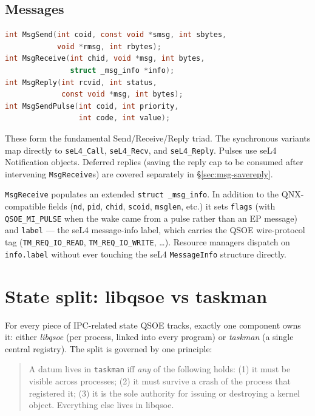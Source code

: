 \subsection{Messages}

\begin{lstlisting}[language=C]
int MsgSend(int coid, const void *smsg, int sbytes,
            void *rmsg, int rbytes);
int MsgReceive(int chid, void *msg, int bytes,
               struct _msg_info *info);
int MsgReply(int rcvid, int status,
             const void *msg, int bytes);
int MsgSendPulse(int coid, int priority,
                 int code, int value);
\end{lstlisting}

These form the fundamental Send/Receive/Reply triad.  The synchronous
variants map directly to \texttt{seL4\_Call}, \texttt{seL4\_Recv}, and
\texttt{seL4\_Reply}.  Pulses use seL4 Notification objects.  Deferred
replies (saving the reply cap to be consumed after intervening
\texttt{MsgReceive}s) are covered separately in
\S\ref{sec:msg-savereply}.

\texttt{MsgReceive} populates an extended \texttt{struct \_msg\_info}.
In addition to the QNX-compatible fields (\texttt{nd}, \texttt{pid},
\texttt{chid}, \texttt{scoid}, \texttt{msglen}, etc.) it sets
\texttt{flags} (with \texttt{QSOE\_MI\_PULSE} when the wake came from a
pulse rather than an EP message) and \texttt{label} --- the seL4
message-info label, which carries the QSOE wire-protocol tag
(\texttt{TM\_REQ\_IO\_READ}, \texttt{TM\_REQ\_IO\_WRITE}, \ldots).
Resource managers dispatch on \texttt{info.label} without ever touching
the seL4 \texttt{MessageInfo} structure directly.

\section{State split: libqsoe vs taskman}
\label{sec:state-split}

For every piece of IPC-related state QSOE tracks, exactly one component
owns it: either \emph{libqsoe} (per process, linked into every program)
or \emph{taskman} (a single central registry).  The split is governed
by one principle:

\begin{quote}
A datum lives in \texttt{taskman} iff \emph{any} of the following holds:
(1) it must be visible across processes; (2) it must survive a crash of
the process that registered it; (3) it is the sole authority for
issuing or destroying a kernel object.  Everything else lives in
libqsoe.
\end{quote}

